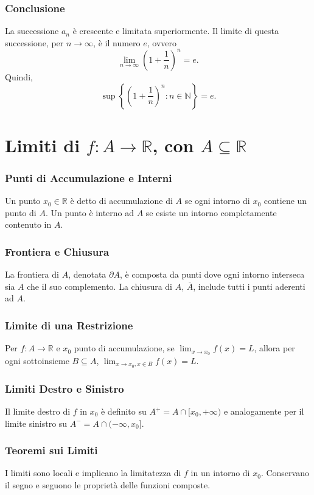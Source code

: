 \documentclass{book}
\begin{document}
\subsection*{Conclusione}
La successione \( a_n \) è crescente e limitata superiormente. Il limite di questa successione, per \( n \to \infty \), è il numero \( e \), ovvero
\[ \lim_{n \to \infty} \left(1 + \frac{1}{n}\right)^n = e. \]
Quindi,
\[ \sup \left\{ \left(1 + \frac{1}{n}\right)^n : n \in \mathbb{N} \right\} = e. \]

\chapter*{Limiti di \( f: A \to \mathbb{R} \), con \( A \subseteq \mathbb{R} \)}

\subsection*{Punti di Accumulazione e Interni}
Un punto \( x_0 \in \mathbb{R} \) è detto di accumulazione di \( A \) se ogni intorno di \( x_0 \) contiene un punto di \( A \). Un punto è interno ad \( A \) se esiste un intorno completamente contenuto in \( A \).

\subsection*{Frontiera e Chiusura}
La frontiera di \( A \), denotata \( \partial A \), è composta da punti dove ogni intorno interseca sia \( A \) che il suo complemento. La chiusura di \( A \), \( \overline{A} \), include tutti i punti aderenti ad \( A \).

\subsection*{Limite di una Restrizione}
Per \( f: A \to \mathbb{R} \) e \( x_0 \) punto di accumulazione, se \( \lim_{x \to x_0} f(x) = L \), allora per ogni sottoinsieme \( B \subseteq A \), \( \lim_{x \to x_0, x \in B} f(x) = L \).

\subsection*{Limiti Destro e Sinistro}
Il limite destro di \( f \) in \( x_0 \) è definito su \( A^+ = A \cap [x_0, +\infty) \) e analogamente per il limite sinistro su \( A^- = A \cap (-\infty, x_0] \).

\subsection*{Teoremi sui Limiti}
I limiti sono locali e implicano la limitatezza di \( f \) in un intorno di \( x_0 \). Conservano il segno e seguono le proprietà delle funzioni composte.
\end{document}
